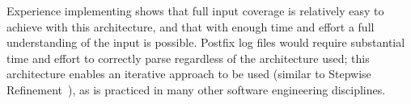 Experience implementing \parsername{} shows that full input coverage is
relatively easy to achieve with this architecture, and that with enough
time and effort a full understanding of the input is possible.  Postfix log
files would require substantial time and effort to correctly parse
regardless of the architecture used; this architecture enables an iterative
approach to be used (similar to Stepwise
Refinement~\cite{stepwise-refinement}), as is practiced in many other
software engineering disciplines.

